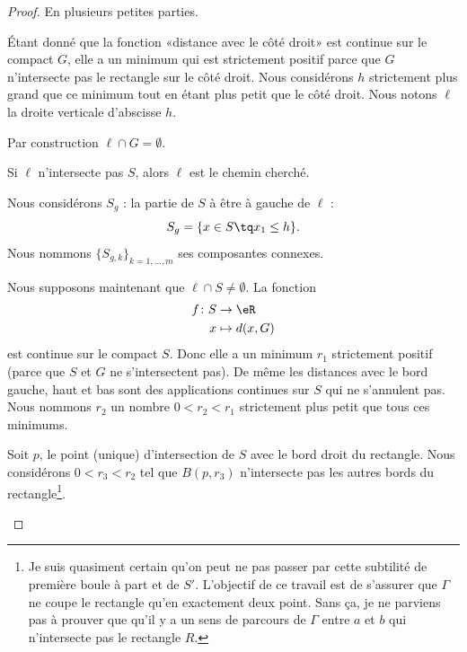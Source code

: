 \begin{proof}
	En plusieurs petites parties.
	\begin{subproof}

		Étant donné que la fonction «distance avec le côté droit» est continue sur le compact \( G\), elle a un minimum qui est strictement positif parce que \( G\) n'intersecte pas le rectangle sur le côté droit. Nous considérons \( h\) strictement plus grand que ce minimum tout en étant plus petit que le côté droit. Nous notons \( \ell\) la droite verticale d'abscisse \( h\).

		Par construction \( \ell\cap G=\emptyset\).

		Si \( \ell\) n'intersecte pas \( S\), alors \( \ell\) est le chemin cherché.

		\spitem[La découpe]
		Nous considérons \( S_g\) : la partie de \( S\) à être à gauche de \( \ell\) :
		\begin{equation}
			S_g=\{ x\in S\tq x_1\leq h \}.
		\end{equation}
		Nous nommons \( \{ S_{g,k} \}_{k=1,\ldots,m}\) ses composantes connexes.


		\spitem[Le recouvrement]
		Nous supposons maintenant que \( \ell\cap S\neq \emptyset\). La fonction
		\begin{equation}
			\begin{aligned}
				f\colon S & \to \eR        \\
				x         & \mapsto d(x,G)
			\end{aligned}
		\end{equation}
		est continue sur le compact \( S\). Donc elle a un minimum \( r_1\) strictement positif (parce que \( S\) et \( G\) ne s'intersectent pas). De même les distances avec le bord gauche, haut et bas sont des applications continues sur \( S\) qui ne s'annulent pas. Nous nommons \( r_2\) un nombre \( 0<r_2<r_1\) strictement plus petit que tous ces minimums.


		Soit \( p\), le point (unique) d'intersection de \( S\) avec le bord droit du rectangle. Nous considérons \( 0<r_3<r_2\) tel que \( B(p,r_3)\) n'intersecte pas les autres bords du rectangle\footnote{Je suis quasiment certain qu'on peut ne pas passer par cette subtilité de première boule à part et de \( S'\). L'objectif de ce travail est de s'assurer que \( \Gamma\) ne coupe le rectangle qu'en exactement deux point. Sans ça, je ne parviens pas à prouver que qu'il y a un sens de parcours de \( \Gamma\) entre \( a\) et \( b\) qui n'intersecte pas le rectangle \( R\).}.


\end{subproof}
\end{proof}
